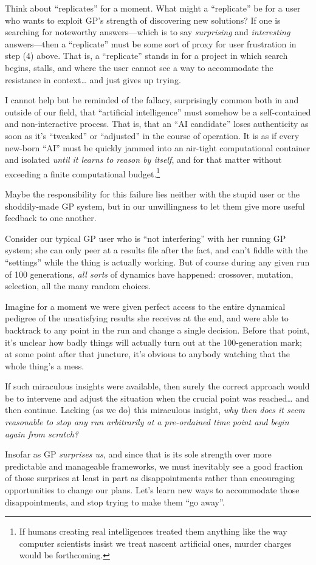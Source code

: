 Think about ``replicates'' for a moment. What might a ``replicate'' be for a user who wants to exploit GP's strength of discovering new solutions? If one is searching for noteworthy answers---which is to say \emph{surprising} and \emph{interesting} answers---then a ``replicate'' must be some sort of proxy for user frustration in step (4) above. That is, a ``replicate'' stands in for a project in which search begins, stalls, and where the user cannot see a way to accommodate the resistance in context\ldots{} and just gives up trying.

I cannot help but be reminded of the fallacy, surprisingly common both in and outside of our field, that ``artificial intelligence'' must somehow be a self-contained and non-interactive process. That is, that an ``AI candidate'' loses  authenticity as soon as it's ``tweaked'' or ``adjusted'' in the course of operation. It is as if every new-born ``AI'' must be quickly jammed into an air-tight computational container and isolated \emph{until it learns to reason by itself}, and for that matter without exceeding a finite computational budget.\footnote{If humans creating real intelligences treated them anything like the way computer scientists insist we treat nascent artificial ones, murder charges would be forthcoming.}

Maybe the responsibility for this failure lies neither with the stupid user or the shoddily-made GP system, but in our unwillingness to let them give more useful feedback to one another.

Consider our typical GP user who is ``not interfering'' with her running GP system; she can only peer at a results file after the fact, and can't fiddle with the ``settings'' while the thing is actually working. But of course during any given run of 100 generations, \emph{all sorts} of dynamics have happened: crossover, mutation, selection, all the many random choices.

Imagine for a moment we were given perfect access to the entire dynamical pedigree of the unsatisfying results she receives at the end, and were able to backtrack to any point in the run and change a single decision. Before that point, it's unclear how badly things will actually turn out at the 100-generation mark; at some point after that juncture, it's obvious to anybody watching that the whole thing's a mess.

If such miraculous insights were available, then surely the correct approach would be to intervene and adjust the situation when the crucial point was reached\ldots{} and then continue. Lacking (as we do) this miraculous insight, \emph{why then does it seem reasonable to stop any run arbitrarily at a pre-ordained time point and begin again from scratch?}

Insofar as GP \emph{surprises us}, and since that is its sole strength over more predictable and manageable frameworks, we must inevitably see a good fraction of those surprises at least in part as disappointments rather than encouraging opportunities to change our plans.  Let's learn new ways to accommodate those disappointments, and stop trying to make them ``go away''.

